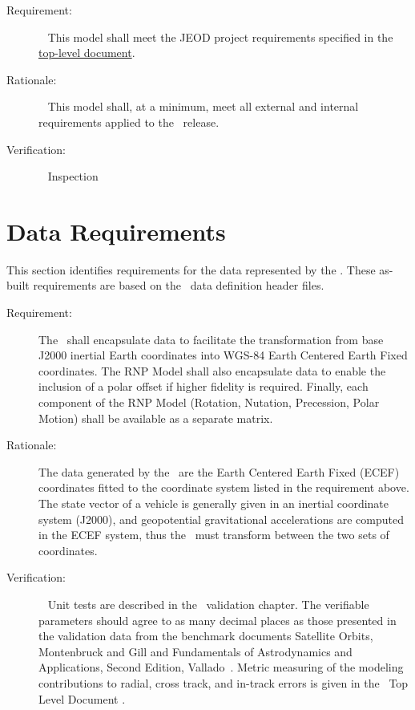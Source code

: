 \label{reqt:toplevel}
\begin{description}
\item[Requirement:]\ \newline
  This model shall meet the JEOD project requirements specified in
  the \JEODid\
  \hyperref{file:\JEODHOME/docs/JEOD.pdf}{part1}{reqt}{ top-level
  document}.
\item[Rationale:]\ \newline
  This model shall, at a minimum,  meet all external and internal requirements
  applied to the \JEODid\ release.
\item[Verification:]\ \newline
     Inspection
\end{description}

\section{Data Requirements}\label{sec:data_reqts}

This section identifies requirements for the data
represented by the \ModelDesc. These as-built requirements are
based on the \ModelDesc\ data definition header files.

\label{reqt:earth_RNP_data}
\begin{description}
  \item[Requirement:]
The \ModelDesc\ shall encapsulate data to facilitate
the transformation from base J2000 inertial Earth coordinates
into WGS-84 Earth Centered Earth Fixed coordinates. The RNP Model
shall also encapsulate data to enable the inclusion of a polar offset
if higher fidelity is required. Finally, each component of the RNP Model
(Rotation, Nutation, Precession, Polar Motion) shall be available
as a separate matrix.
  \item[Rationale:]
The data generated by the \ModelDesc\ are the Earth Centered Earth Fixed (ECEF)
coordinates fitted to the coordinate system listed in the requirement above.
The state vector of a vehicle is generally given in an inertial coordinate
system (J2000), and geopotential gravitational accelerations are
computed in the ECEF system, thus the \ModelDesc\ must transform between
the two sets of coordinates.
  \item[Verification:]\ \newline
Unit tests are described in the \ModelDesc\ validation chapter. The verifiable
parameters should agree to as many decimal places as those presented in the
validation data from the benchmark documents Satellite Orbits,
Montenbruck and Gill \cite{MG} and Fundamentals of Astrodynamics and
Applications, Second Edition, Vallado~\cite{VMcC}.  Metric measuring of
the modeling contributions to radial, cross track, and in-track errors
is given in the \JEODid\ Top Level Document \cite{dynenv:JEOD}.
\end{description}

